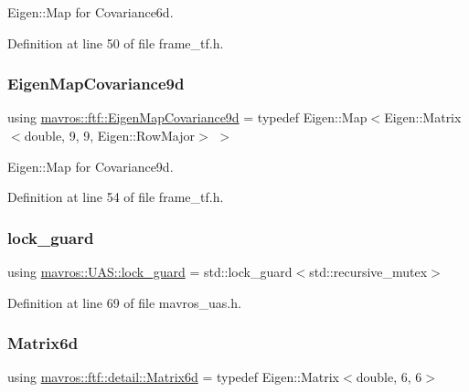 Eigen\+::\+Map for Covariance6d. 



Definition at line 50 of file frame\+\_\+tf.\+h.

\mbox{\label{group__nodelib_ga69e67d58da05f220a6e938fdccdf5a07}} 
\subsubsection{\texorpdfstring{EigenMapCovariance9d}{EigenMapCovariance9d}}
{\footnotesize\ttfamily using \mbox{\hyperlink{group__nodelib_ga69e67d58da05f220a6e938fdccdf5a07}{mavros\+::ftf\+::\+Eigen\+Map\+Covariance9d}} = typedef Eigen\+::\+Map$<$Eigen\+::\+Matrix$<$double, 9, 9, Eigen\+::\+Row\+Major$>$ $>$}



Eigen\+::\+Map for Covariance9d. 



Definition at line 54 of file frame\+\_\+tf.\+h.

\mbox{\label{group__nodelib_ga823ce64cc07d60ff4b1405ca4e4b4e89}} 
\subsubsection{\texorpdfstring{lock\_guard}{lock\_guard}}
{\footnotesize\ttfamily using \mbox{\hyperlink{group__nodelib_ga823ce64cc07d60ff4b1405ca4e4b4e89}{mavros\+::\+U\+A\+S\+::lock\+\_\+guard}} =  std\+::lock\+\_\+guard$<$std\+::recursive\+\_\+mutex$>$}



Definition at line 69 of file mavros\+\_\+uas.\+h.

\mbox{\label{group__nodelib_ga510487eae2b1df3a44a6e645120b0389}} 
\subsubsection{\texorpdfstring{Matrix6d}{Matrix6d}}
{\footnotesize\ttfamily using \mbox{\hyperlink{group__nodelib_ga510487eae2b1df3a44a6e645120b0389}{mavros\+::ftf\+::detail\+::\+Matrix6d}} = typedef Eigen\+::\+Matrix$<$double, 6, 6$>$}



